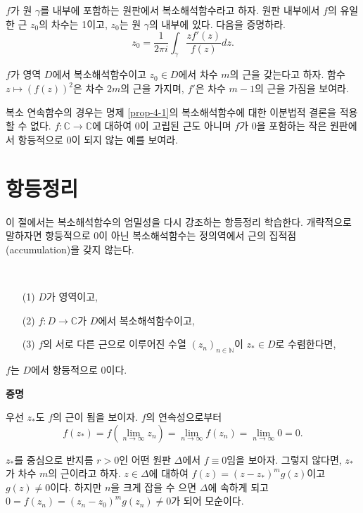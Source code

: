 \begin{salt_exercise} \label{ex-4-19}
$f$가 원 $\gamma$를 내부에 포함하는 원판에서 복소해석함수라고 하자.
원판 내부에서 $f$의 유일한 근 $z_0$의 차수는 1이고,
$z_0$는 원 $\gamma$의 내부에 있다.
다음을 증명하라.
\[
z_0 = \dfrac1{2\pi i} \int_\gamma \dfrac{zf'(z)}{f(z)} dz.
\]
\end{salt_exercise}

\begin{salt_exercise} \label{ex-4-20}
$f$가 영역 $D$에서 복소해석함수이고 $z_0\in D$에서
차수 $m$의 근을 갖는다고 하자.
함수 $z \mapsto (f(z))^2$은 차수 $2m$의 근을 가지며,
$f'$은 차수 $m-1$의 근을 가짐을 보여라.
\end{salt_exercise}

\begin{salt_exercise} \label{ex-4-21}
복소 연속함수의 경우는 명제 \ref{prop-4-1}의 복소해석함수에 대한
이분법적 결론을 적용할 수 없다. 
$f:\mathbb C \to \mathbb C$에 대하여 
$0$이  고립된 근도 아니며 $f$가 $0$을 포함하는 작은 원판에서  
항등적으로 $0$이 되지 않는 예를 보여라.
\end{salt_exercise}

\section{항등정리}

이 절에서는 복소해석함수의 엄밀성을 다시 강조하는 항등정리 학습한다.
개략적으로 말하자면
항등적으로 $0$이 아닌 복소해석함수는 정의역에서 근의 집적점(accumulation)을 갖지 않는다.

\begin{salttheorem}{}{} \label{thm-4-5}
\
\begin{itemize}
\item[(1)] $D$가 영역이고,
\item[(2)] $f:D\to\mathbb C$가 $D$에서 복소해석함수이고,
\item[(3)] $f$의 서로 다른 근으로 이루어진 수열 $(z_n)_{n\in\mathbb N}$이 $z_*\in D$로 수렴한다면,
\end{itemize}
$f$는 $D$에서 항등적으로 $0$이다.
\end{salttheorem}

{\bf 증명}

우선 $z_*$도 $f$의 근이 됨을 보이자.
$f$의 연속성으로부터
\[
f(z_*) = f\left(\lim_{n\to\infty} z_n \right) = \lim_{n\to\infty}f( z_n) 
= \lim_{n\to\infty} 0 = 0.
\]

$z_*$를 중심으로 반지름 $r>0$인 어떤 원판 $\Delta$에서 $f\equiv0$임을 보아자.
그렇지 않다면, $z_*$가 차수 $m$의 근이라고 하자.
$z\in \Delta$에 대하여
$f(z)=(z-z_*)^mg(z)$이고 $g(z)\ne0$이다.
하지만 $n$을 크게 잡을 수 으면 $\Delta$에 속하게 되고
$0 = f(z_n) = (z_n-z_0)^m g(z_n) \ne 0$가 되어 모순이다.

